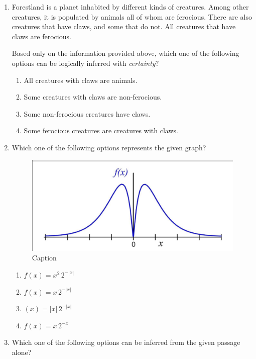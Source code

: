 \documentclass[journal]{IEEEtran}
\begin{document}
\begin{enumerate}
\item 
Forestland is a planet inhabited by different kinds of creatures. Among other creatures, it is populated by animals all of whom are ferocious. There are also creatures that have claws, and some that do not. All creatures that have claws are ferocious.



Based only on the information provided above, which one of the following options can be logically inferred with \textit{certainty}?

\hfill{}

\begin{enumerate}
    \item All creatures with claws are animals.
    \item Some creatures with claws are non-ferocious.
    \item Some non-ferocious creatures have claws.
    \item Some ferocious creatures are creatures with claws.
\end{enumerate}

\item 
Which one of the following options represents the given graph?

\hfill{}
\begin{figure}[H]
    \centering
    \includegraphics[width=0.5\columnwidth]{Figs/q7.png}
    \caption{Caption}
    \label{fig:placeholder}
\end{figure}
\begin{enumerate}


 \item $ f(x) = x^2 \, 2^{-|x|} $\\[0.8em]
\item  $ f(x) = x \, 2^{-|x|} $\\[0.8em]
\item $(x) = |x| \, 2^{-|x|} $\\[0.8em]
 \item $f(x) = x \, 2^{-x}$ \\
\end{enumerate}
     
     
  \item 
Which one of the following options can be inferred from the given passage alone?


\end{enumerate}
\end{document}

